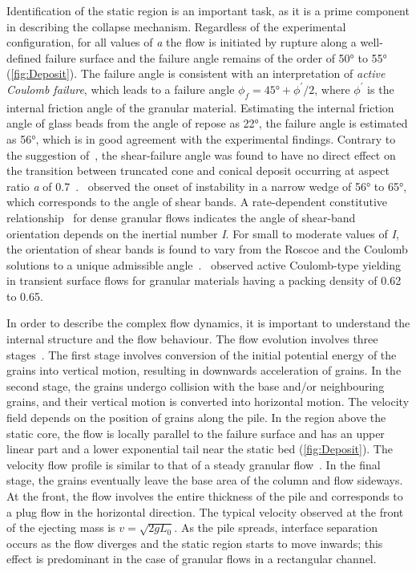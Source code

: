 Identification of the static region is an important task, as it is a prime 
component in describing the collapse mechanism. Regardless of the experimental 
configuration, for all values of \textit{a} the flow is initiated by rupture 
along a well-defined failure surface and the failure angle remains of the order 
of 50\si{\degree} to 55\si{\degree} (\cref{fig:Deposit}). The failure angle is 
consistent with an interpretation of \textit{active Coulomb failure}, which 
leads to a failure angle $\phi_{\textit{f}}=45\si{\degree} +\phi^\prime / 2$, 
where $\phi^\prime$ is the internal friction angle of the granular material. 
Estimating the internal friction angle 
of glass beads from the angle of repose as 22\si{\degree}, the failure angle is 
estimated as 56\si{\degree}, which is in good agreement with the experimental 
findings. Contrary to the suggestion of~\citet{Lajeunesse2004}, the 
shear-failure 
angle was found to have no direct effect on the transition between truncated 
cone and conical deposit occurring at aspect ratio \textit{a} of 
0.7~\citep{Lajeunesse2005}.~\citet{Schaeffer1990} observed the onset of 
instability in a narrow wedge of 56\si{\degree} to 
65\si{\degree}, which corresponds to the angle of shear bands. A 
rate-dependent constitutive relationship~\citep{Jop2006} for dense granular 
flows indicates the angle of shear-band orientation depends on the inertial 
number \textit{I}. For small to moderate values of \textit{I}, the orientation 
of shear bands is found to vary from the Roscoe and the Coulomb solutions to a 
unique admissible angle~\citep{Lemiale2011}.~\citet{Daerr1999} observed active 
Coulomb-type yielding in transient surface flows for granular materials having 
a packing density of 0.62 to 0.65. 


In order to describe the complex flow dynamics, it is important to understand 
the internal structure and the flow behaviour. 
The flow evolution involves three stages~\citep{Staron2007a}. 
The first stage involves conversion of the initial potential energy of the 
grains into vertical motion, resulting in downwards acceleration of grains. In 
the second stage, the grains undergo collision with the base and/or 
neighbouring grains, and their vertical motion is converted into horizontal 
motion. The velocity field depends on the position of grains along the 
pile. In the region above the static core, the 
flow is locally parallel to the failure surface and has an upper linear part 
and a lower exponential tail near the static bed (\cref{fig:Deposit}). The 
velocity flow profile is similar to that of a steady granular 
flow~\citep{Midi2004}. In the final 
stage, the grains eventually leave the base area of the column and flow 
sideways. At the 
front, the flow involves the entire thickness of the pile and corresponds to a 
plug flow in the horizontal direction. The typical 
velocity observed at the front of the ejecting mass is 
$\textit{v}=\sqrt{2\textit{g}\textit{L}_{\textit{0}}}$. As the pile spreads, 
interface separation occurs as the 
flow diverges and the static region starts to move inwards; this effect is 
predominant in the case of granular flows in a rectangular channel. 

